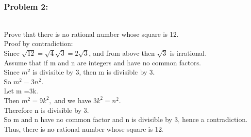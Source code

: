 \newpage
\subsubsection*{Problem 2:} \\ 
Prove that there is no rational number whose square is 12. \\ 
Proof by contradiction:\\ 
Since $\sqrt{12}=\sqrt{4} \sqrt{3}= 2 \sqrt{3}$,  and from above then $\sqrt{3}$ is irrational. \\ 
Assume that if m and n are integers and have no common factors. \\ 
Since $m^2$ is divisible by 3, then m is divisible by 3. \\  
So $m^2 = 3n^2.$ \\  Let m =3k. \\ 
Then $m^2= 9k^2,$ and we have $3k^2= n^2.$ \\ 
Therefore n is divisible by 3. \\ 
So m and n have no common factor and n is divisible by 3, hence a contradiction.  
\\
Thus, there is no rational number whose square is 12.

\begin{figure}[h]\end{figure} 


